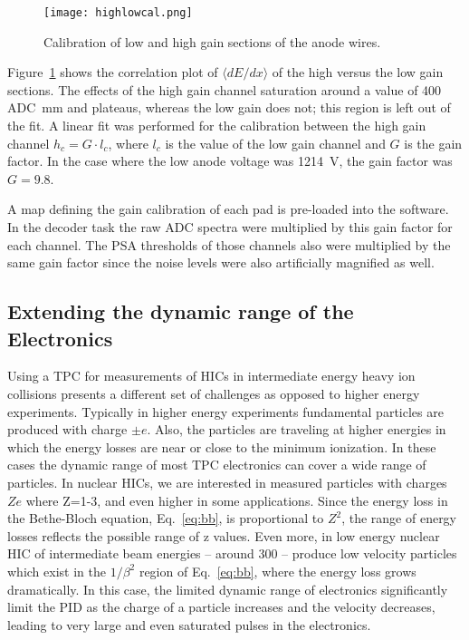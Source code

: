 \begin{figure}[!htb]
\texttt{[image: highlowcal.png]}
\caption{Calibration of low and high gain sections of the anode wires.}
\label{fig:highlowcal}
\end{figure}

Figure~\ref{fig:highlowcal} shows the correlation plot of $\langle dE/dx\rangle$ of the high versus the low gain sections. The effects of the high gain channel saturation around a value of 400 ADC\si{\per\milli\metre} and plateaus, whereas the low gain does not; this region is left out of the fit. A linear fit was performed for the calibration between the high gain channel $h_c = G\cdot l_c$, where $l_c$ is the value of the low gain channel and $G$ is the gain factor. In the case where the low anode voltage was \SI{1214}{\volt}, the gain factor was $G=9.8$.


 A map defining the gain calibration of each pad is pre-loaded into the software. In the decoder task the raw ADC spectra were multiplied by this gain factor for each channel. The PSA thresholds of those channels also were multiplied by the same gain factor since the noise levels were also artificially magnified as well. 

\subsection{Extending the dynamic range of the Electronics}
\label{sec:extendDynamicRange}

Using a TPC for measurements of HICs in intermediate energy heavy ion collisions presents a different set of challenges as opposed to higher energy experiments. Typically in higher energy experiments fundamental particles are produced with charge $\pm e$. Also, the particles are traveling at higher energies in which the energy losses are near or close to the minimum ionization. In these cases the dynamic range of most TPC electronics can cover a wide range of particles. In nuclear HICs, we are interested in measured particles with charges $Ze$ where Z=1-3, and even higher in some applications. Since the energy loss in the Bethe-Bloch equation, Eq.~\ref{eq:bb}, is proportional to $Z^2$, the range of energy losses reflects the possible range of z values. Even more, in low energy nuclear HIC of intermediate beam energies -- around \SI{300}{\MeVA} -- produce low velocity particles which exist in the $1/\beta^2$ region of Eq.~\ref{eq:bb}, where the energy loss grows dramatically. In this case, the limited dynamic range of electronics significantly limit the PID as the charge of a particle increases and the velocity decreases, leading to very large and even saturated pulses in the electronics. 

